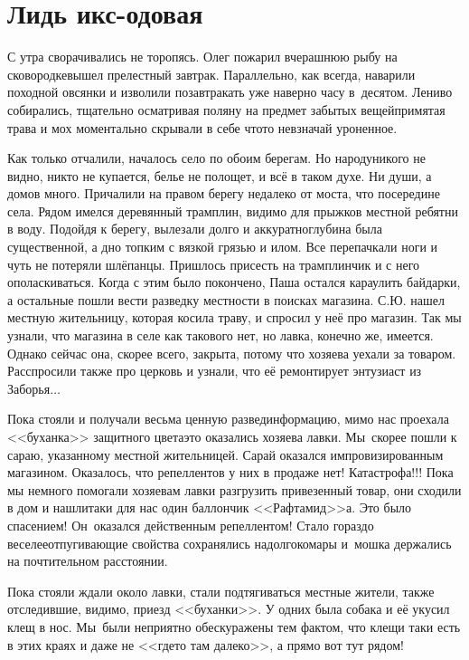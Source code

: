 \chapter{Лидь икс-одовая} 
\vepsianrose

С утра сворачивались не торопясь. Олег пожарил вчерашнюю рыбу на сковородке\mdash вышел прелестный завтрак. Параллельно, как всегда, наварили походной овсянки и изволили позавтракать уже наверно часу в~десятом. Лениво собирались, тщательно осматривая поляну на предмет забытых вещей\mdash примятая трава и мох моментально скрывали в себе что\sdash то невзначай уроненное.

Как только отчалили, началось село по обоим берегам. Но народу\mdash никого не видно, никто не купается, белье не полощет, и всё в таком духе. Ни души, а домов много. Причалили на правом берегу недалеко от моста, что посередине села. Рядом имелся деревянный трамплин, видимо для прыжков местной ребятни в воду. Подойдя к берегу, вылезали долго и аккуратно\mdash глубина была существенной, а дно топким с вязкой грязью и илом. Все перепачкали ноги и чуть не потеряли шлёпанцы. Пришлось присесть на трамплинчик и с него ополаскиваться. Когда с этим было покончено, Паша остался караулить байдарки, а остальные пошли вести разведку местности в поисках магазина. С.Ю. нашел местную жительницу, которая косила траву, и спросил у неё про магазин. Так мы узнали, что магазина в селе как такового нет, но лавка, конечно же, имеется. Однако сейчас она, скорее всего, закрыта, потому что хозяева уехали за товаром. Расспросили также про церковь и узнали, что её ремонтирует энтузиаст из Заборья$\ldots$
 
Пока стояли и получали весьма ценную развединформацию, мимо нас проехала <<буханка>> защитного цвета\mdash это оказались хозяева лавки. Мы~скорее пошли к сараю, указанному местной жительницей. Сарай оказался импровизированным магазином. Оказалось, что репеллентов у них в продаже нет! Катастрофа!!! Пока мы немного помогали хозяевам лавки разгрузить привезенный товар, они сходили в дом и нашли\sdash таки для нас один баллончик <<Рафтамид>>\sdash а. Это было спасением! Он~оказался действенным репеллентом! Стало гораздо веселее\mdash отпугивающие свойства сохранялись надолго\mdash комары и~мошка держались на почтительном расстоянии. 

Пока стояли ждали около лавки, стали подтягиваться местные жители, также отследившие, видимо, приезд <<буханки>>. У одних была собака и её укусил клещ в нос. Мы~были неприятно обескуражены тем фактом, что клещи таки есть в этих краях и даже не <<где\sdash то там далеко>>, а прямо вот тут рядом!

